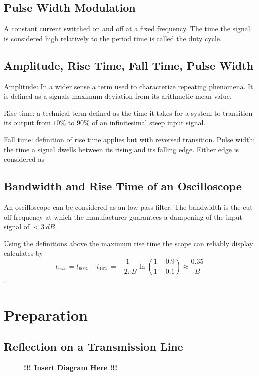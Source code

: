     \subsection*{Pulse Width Modulation}
        A constant current switched on and off at a fixed frequency. The time the signal is considered high relatively to the
        period time is called the duty cycle.
    \subsection*{Amplitude, Rise Time, Fall Time, Pulse Width}
        Amplitude: In a wider sense a term used to characterize repeating phenomena. It is defined as a signals maximum deviation
        from its arithmetic mean value.\par
        Rise time: a technical term defined as the time it takes for a system to transition its output from \( 10\% \) to \( 90\% \)
        of an infinitesimal steep input signal.\par
        Fall time: definition of rise time applies but with reversed transition.
        Pulse width: the time a signal dwells between its rising and its falling edge. Either edge is considered as 
    \subsection*{Bandwidth and Rise Time of an Oscilloscope}
        An oscilloscope can be considered as an low-pass filter. The bandwidth is the cut-off frequency at which the manufacturer
        guarantees a dampening of the input signal of \( < \SI{3}{dB} \).\par
        Using the definitions above the maximum rise time the scope can reliably display calculates by
        \begin{equation}
            t_{rise} = t_{90\%} - t_{10\%} = \frac{1}{-2\pi B} \ln\left( \frac{1-0.9}{1-0.1} \right) \approx \frac{0.35}{B}
            \label{eq:bandwidth_and_riseTime}
        \end{equation}.
\section{Preparation}
%
    \subsection*{Reflection on a Transmission Line}
        \begin{figure}[h]
            \centering
            \begin{framed}
                \textbf{!!! Insert Diagram Here !!!}
            \end{framed}
        \end{figure}
